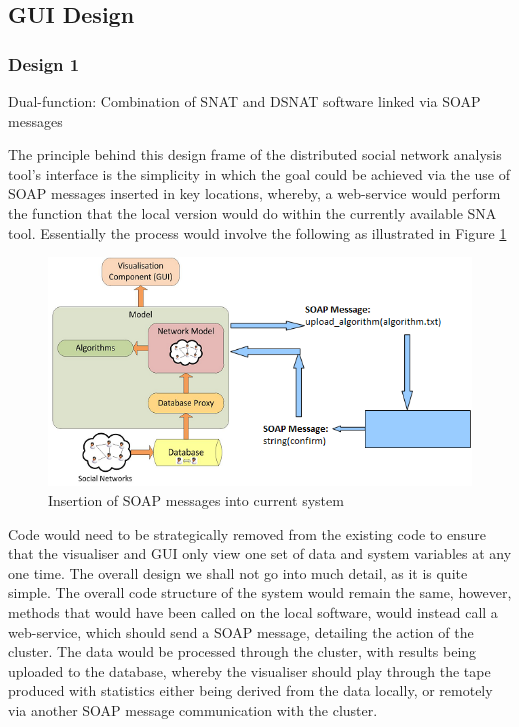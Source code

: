 \subsection{GUI Design}

\subsubsection{Design 1}
Dual-function: Combination of SNAT and DSNAT software linked via SOAP messages

The principle behind this design frame of the distributed social network analysis tool's interface is the simplicity in which the goal could be achieved via the use of SOAP messages inserted in key locations, whereby, a web-service would perform the function that the local version would do within the currently available SNA tool. Essentially the process would involve the following as illustrated in Figure \ref{fig:des1}

\begin{figure}%
\centering
\includegraphics[width=0.6\columnwidth]{./img/des1}%
\caption{Insertion of SOAP messages into current system}%
\label{fig:des1}%
\end{figure}

Code would need to be strategically removed from the existing code to ensure that the visualiser and GUI only view one set of data and system variables at any one time. The overall design we shall not go into much detail, as it is quite simple. The overall code structure of the system would remain the same, however, methods that would have been called on the local software, would instead call a web-service, which should send a SOAP message, detailing the action of the cluster. The data would be processed through the cluster, with results being uploaded to the database, whereby the visualiser should play through the tape produced with statistics either being derived from the data locally, or remotely via another SOAP message communication with the cluster.

